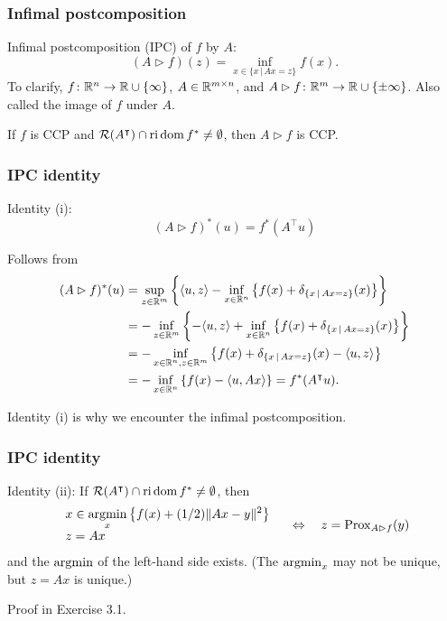 \documentclass[10pt,mathserif]{beamer}
\begin{document}
\begin{frame}
\frametitle{Infimal postcomposition}
Infimal postcomposition (IPC) of $f$ by $A$:
\[
(A\rhd f)(z)=\inf_{x\in \{x\,|\,Ax=z\}}f(x).
\]
To clarify, $f\colon \mathbb{R}^n\rightarrow \mathbb{R}\cup\{\infty\}$, $A\in \mathbb{R}^{m\times n}$, and
$A\rhd f\colon \mathbb{R}^m\rightarrow\mathbb{R}\cup\{\pm \infty\}$.
Also called the image of $f$ under $A$.

\vspace{0.2in}
If $f$ is CCP and ${\mathcal{R}}(A^\intercal)\cap \mathrm{ri}\, \mathrm{dom}\, f^*\ne \emptyset$, then $A\rhd f$ is CCP.
\end{frame}



\begin{frame}[label=frame_ipc_formula1]
\frametitle{IPC identity}
Identity (i):
\[
(A\rhd f)^*(u)=f^*(A^\intercal u)
\]

\vspace{0.2in}


Follows from 
\begin{align*}
(A\rhd f)^*(u)&
=\sup_{z\in \mathbb{R}^m}\left\{
\langle u,z\rangle -
\inf_{x\in \mathbb{R}^n}\left\{f(x)+\delta_{\{x\,|\,Ax=z\}}(x)\right\}
\right\}\nonumber\\
&=-\inf_{z\in \mathbb{R}^m}\left\{
-\langle u,z\rangle +
\inf_{x\in \mathbb{R}^n}\left\{f(x)+\delta_{\{x\,|\,Ax=z\}}(x)\right\}
\right\}\nonumber\\
&=-\inf_{x\in\mathbb{R}^n,z\in\mathbb{R}^m}\left\{
f(x)+\delta_{\{x\,|\,Ax=z\}}(x)-\langle u,z\rangle
\right\}\nonumber\\
&=-\inf_{x\in \mathbb{R}^n}\left\{
f(x)-\langle u,Ax\rangle
\right\}\nonumber=f^*(A^\intercal u).
\end{align*}
\vspace{0.2in}

Identity (i) is why we encounter the infimal postcomposition.
\end{frame}

\begin{frame}[label=frame_ipc_formula2]
\frametitle{IPC identity}

Identity (ii):
If $\mathcal{R}(A^\intercal)\cap\mathrm{ri}\, \mathrm{dom}\, f^*\ne \emptyset$, then
\[
\begin{array}{l}
\displaystyle{x\in \operatorname*{argmin}_x \left\{f(x) + (1/2)\|Ax-y\|^2\right\}}\\
z=Ax
\end{array}
\quad\Leftrightarrow\quad
z=\mathrm{Prox}_{A\rhd f}(y)
\]
and the $\operatorname*{argmin}$ of the left-hand side exists.
(The $\operatorname*{argmin}_x$ may not be unique, but $z=Ax$ is unique.)
\vspace{0.2in}

Proof in Exercise 3.1.
\end{frame}
\end{document}
